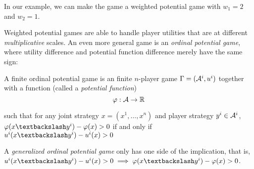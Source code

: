 In our example, we can make the game a weighted potential game with $w_1 = 2$ and $w_2 = 1$.


Weighted potential games are able to handle player utilities that are at different {\em multiplicative} scales. An even more general game is an {\em ordinal potential game}, where utility difference and potential function difference merely have the same sign:

\begin{mydef}
A finite ordinal potential game is an finite $n$-player game $\Gamma = (\AA^i, u^i)$ together with a function (called a {\em potential function}) 
$$
\phi: \AA \rightarrow \R
$$

 such that for any joint strategy $x = (x^1, \ldots, x^n)$ and player strategy $y^i \in \AA^i$, $\phi(\asub{x}{y^i}) - \phi(x) > 0$ if and only if $ u^i(\asub{x}{y^i}) - u^i(x) > 0$
\end{mydef}

A {\em generalized ordinal potential game} only has one side of the implication, that is, $ u^i(\asub{x}{y^i}) - u^i(x) > 0 \implies \phi(\asub{x}{y^i}) - \phi(x) > 0$. 